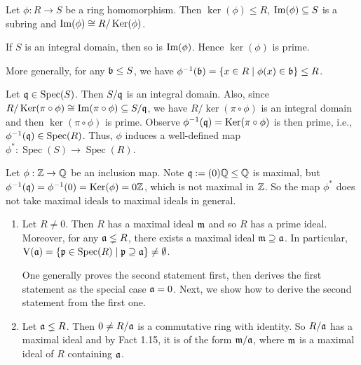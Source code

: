 \begin{fact}
    Let $\phi: R \to S$ be a ring homomorphism. Then $\ker(\phi) \leq R$, $\operatorname{Im}(\phi) \subseteq S$ is a subring and $\operatorname{Im}(\phi) \cong R/\operatorname{Ker}(\phi)$. \par 
    If $S$ is an integral domain, then so is $\operatorname{Im}(\phi)$. Hence $\ker(\phi)$ is prime. \par
    More generally, for any $\mathfrak{b} \leq S$, we have $\phi^{-1}(\mathfrak{b}) = \{x \in R \mid \phi(x) \in \mathfrak{b}\} \leq R$.
    \begin{center}
    \end{center}
    \par
    Let $\mathfrak{q} \in \operatorname{Spec}(S)$. Then $S/\mathfrak{q}$ is an integral domain. Also, since $R/\operatorname{Ker}(\pi \circ \phi) \cong \operatorname{Im}(\pi \circ \phi) \subseteq S/\mathfrak{q}$, we have $R/\ker(\pi \circ \phi)$ is an integral domain and then $\ker(\pi \circ \phi)$ is prime. Observe $\phi^{-1}(\mathfrak{q}) = \operatorname{Ker}(\pi \circ \phi)$ is then prime, i.e., $\phi^{-1}(\mathfrak{q}) \in \operatorname{Spec}(R)$. Thus, $\phi$ induces a well-defined map $\phi^*: \operatorname{Spec}(S) \to \operatorname{Spec}(R)$.
    \end{fact}

\begin{example*}
    Let $\phi: \mathbb{Z} \to \mathbb{Q}$ be an inclusion map. Note $\mathfrak{q} := (0)\mathbb{Q} \leq \mathbb{Q}$ is maximal, but $\phi^{-1}(\mathfrak{q}) = \phi^{-1}(0) = \operatorname{Ker}(\phi) = 0 \mathbb{Z}$, which is not maximal in $\mathbb{Z}$. So the map $\phi^*$ does not take maximal ideals to maximal ideals in general.
\end{example*}

\begin{fact}
    \begin{enumerate}
        \item 
            Let $R \neq 0$. Then $R$ has a maximal ideal $\mathfrak{m}$ and so $R$ has a prime ideal. Moreover, for any $\mathfrak{a} \lneq R$, there exists a maximal ideal $\mathfrak{m} \supseteq \mathfrak{a}$. In particular, $\operatorname{V}(\mathfrak{a}) = \{\mathfrak{p} \in \operatorname{Spec}(R) \mid \mathfrak{p} \supseteq \mathfrak{a}\} \neq \emptyset$. \par
            One generally proves the second statement first, then derives the first statement as the special case $\mathfrak{a} = 0$. Next, we show how to derive the second statement from the first one.
        \item 
            Let $\mathfrak{a} \lneq R$. Then $0 \neq R/\mathfrak{a}$ is a commutative ring with identity. So $R/\mathfrak{a}$ has a maximal ideal and by Fact 1.15, it is of the form $\mathfrak{m}/\mathfrak{a}$, where $\mathfrak{m}$ is a maximal ideal of $R$ containing $\mathfrak{a}$.
    \end{enumerate}
\end{fact}

